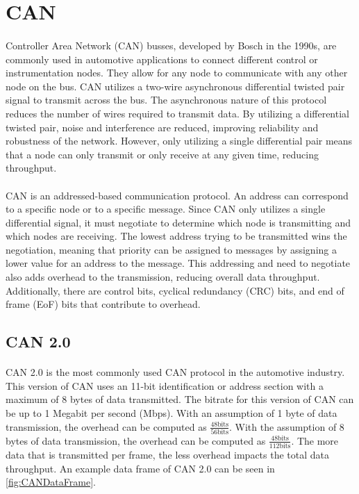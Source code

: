 \section{CAN}

\paragraph{}
Controller Area Network (CAN) \cite{wikipediaCAN} busses, developed by Bosch in the 1990s, are commonly used in automotive applications to connect different control or instrumentation nodes.
They allow for any node to communicate with any other node on the bus.
CAN utilizes a two-wire asynchronous differential twisted pair signal to transmit across the bus.
The asynchronous nature of this protocol reduces the number of wires required to transmit data.
By utilizing a differential twisted pair, noise and interference are reduced, improving reliability and robustness of the network.
However, only utilizing a single differential pair means that a node can only transmit or only receive at any given time, reducing throughput.

\paragraph{}
CAN is an addressed-based communication protocol.
An address can correspond to a specific node or to a specific message.
Since CAN only utilizes a single differential signal, it must negotiate to determine which node is transmitting and which nodes are receiving.
The lowest address trying to be transmitted wins the negotiation, meaning that priority can be assigned to messages by assigning a lower value for an address to the message.
This addressing and need to negotiate also adds overhead to the transmission, reducing overall data throughput.
Additionally, there are control bits, cyclical redundancy (CRC) bits, and end of frame (EoF) bits that contribute to overhead.

\subsection{CAN 2.0}

\paragraph{}
CAN 2.0 \cite{BOSCH_CAN20} is the most commonly used CAN protocol in the automotive industry.
This version of CAN uses an 11-bit identification or address section with a maximum of 8 bytes of data transmitted.
The bitrate for this version of CAN can be up to 1 Megabit per second (Mbps).
With an assumption of 1 byte of data transmission, the overhead can be computed as $\frac{48 \text{bits}}{56 \text{bits}}$.  With the assumption of 8 bytes of data transmission, the overhead can be computed as $\frac{48 \text{bits}}{112 \text{bits}}$.
The more data that is transmitted per frame, the less overhead impacts the total data throughput.
An example data frame of CAN 2.0 can be seen in \cref{fig:CANDataFrame}.

